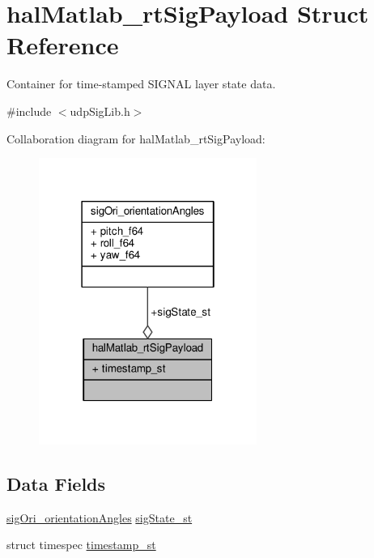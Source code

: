 \hypertarget{structhalMatlab__rtSigPayload}{\section{hal\+Matlab\+\_\+rt\+Sig\+Payload Struct Reference}
\label{structhalMatlab__rtSigPayload}
}


Container for time-\/stamped S\+I\+G\+N\+A\+L layer state data.  




{\ttfamily \#include $<$udp\+Sig\+Lib.\+h$>$}



Collaboration diagram for hal\+Matlab\+\_\+rt\+Sig\+Payload\+:
\nopagebreak
\begin{figure}[H]
\begin{center}
\leavevmode
\includegraphics[width=202pt]{structhalMatlab__rtSigPayload__coll__graph}
\end{center}
\end{figure}
\subsection*{Data Fields}
\begin{DoxyCompactItemize}
\item 
\hyperlink{structsigOri__orientationAngles}{sig\+Ori\+\_\+orientation\+Angles} \hyperlink{structhalMatlab__rtSigPayload_acbe0c4752e7c359734effc1f17f5f494_acbe0c4752e7c359734effc1f17f5f494}{sig\+State\+\_\+st}
\item 
struct timespec \hyperlink{structhalMatlab__rtSigPayload_acf78b49f8e27a0097931fe0e57d14819_acf78b49f8e27a0097931fe0e57d14819}{timestamp\+\_\+st}
\end{DoxyCompactItemize}



